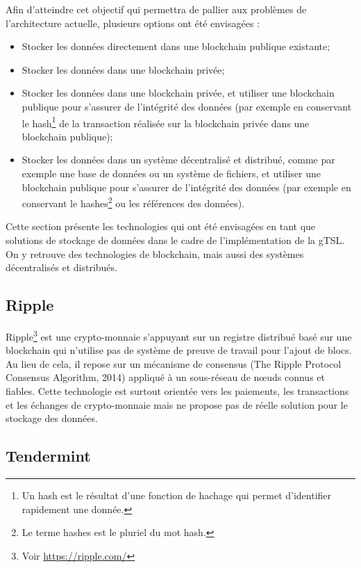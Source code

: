 \documentclass{tnreport}
\begin{document}
Afin d'atteindre cet objectif qui permettra de pallier aux problèmes de l'architecture actuelle, plusieurs options ont été envisagées :
\begin{itemize}
	\item Stocker les données directement dans une blockchain publique existante;
	\item Stocker les données dans une blockchain privée;
	\item Stocker les données dans une blockchain privée, et utiliser une blockchain publique pour s'assurer de l'intégrité des données (par exemple en conservant le hash\footnote{Un hash est le résultat d'une fonction de hachage qui permet d'identifier rapidement une donnée.} de la transaction réalisée sur la blockchain privée dans une blockchain publique);
	\item Stocker les données dans un système décentralisé et distribué, comme par exemple une base de données ou un système de fichiers, et utiliser une blockchain publique pour s'assurer de l'intégrité des données (par exemple en conservant le hashes\footnote{Le terme hashes est le pluriel du mot hash.} ou les références des données).
	\newline
\end{itemize}

Cette section présente les technologies qui ont été envisagées en tant que solutions de stockage de données dans le cadre de l'implémentation de la gTSL. On y retrouve des technologies de blockchain, mais aussi des systèmes décentralisés et distribués.

\subsection{Ripple}

Ripple\footnote{Voir \url{https://ripple.com/}} est une crypto-monnaie s'appuyant sur un registre distribué basé sur une blockchain qui n'utilise pas de système de preuve de travail pour l'ajout de blocs. Au lieu de cela, il repose sur un mécanisme de consensus (The Ripple Protocol Consensus Algorithm, 2014) appliqué à un sous-réseau de nœuds connus et fiables. Cette technologie est surtout orientée vers les paiements, les transactions et les échanges de crypto-monnaie mais ne propose pas de réelle solution pour le stockage des données.

\subsection{Tendermint}
\end{document}

